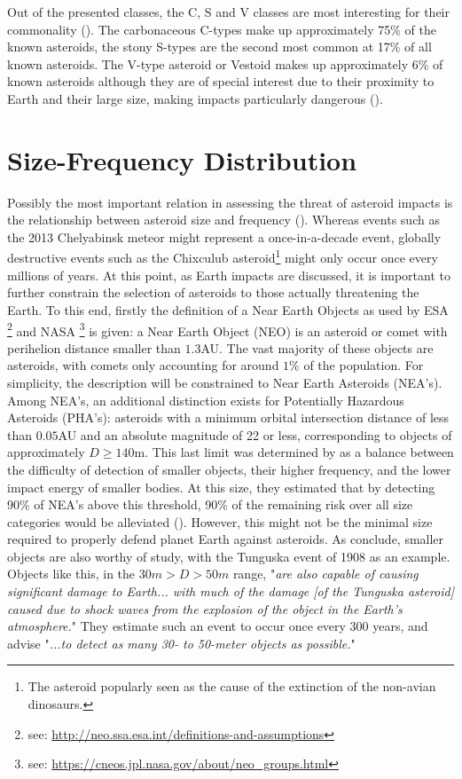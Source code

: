 Out of the presented classes, the C, S and V classes are most interesting for their commonality (\cite{smassiitwo}). The carbonaceous C-types make up approximately 75\% of the known asteroids, the stony S-types are the second most common at 17\% of all known asteroids. The V-type asteroid or Vestoid makes up approximately 6\% of known asteroids although they are of special interest due to their proximity to Earth and their large size, making impacts particularly dangerous (\cite{vestoid}).\\

\section{Size-Frequency Distribution}
\label{sec:sizedistribution}

Possibly the most important relation in assessing the threat of asteroid impacts is the relationship between asteroid size and frequency (\cite{firstpaper}). Whereas events such as the 2013 Chelyabinsk meteor might represent a once-in-a-decade event, globally destructive events such as the Chixculub asteroid\footnote{The asteroid popularly seen as the cause of the extinction of the non-avian dinosaurs.} might only occur once every millions of years. At this point, as Earth impacts are discussed, it is important to further constrain the selection of asteroids to those actually threatening the Earth. To this end, firstly the definition of a Near Earth Objects as used by ESA \footnote{see: \url{http://neo.ssa.esa.int/definitions-and-assumptions}} and NASA \footnote{see: \url{https://cneos.jpl.nasa.gov/about/neo_groups.html}} is given: a Near Earth Object (NEO) is an asteroid or comet with perihelion distance smaller than $1.3$AU. The vast majority of these objects are asteroids, with comets only accounting for around $1\%$ of the population. For simplicity, the description will be constrained to Near Earth Asteroids (NEA's). Among NEA's, an additional distinction exists for Potentially Hazardous Asteroids (PHA's): asteroids with a minimum orbital intersection distance of less than $0.05$AU and an absolute magnitude of 22 or less, corresponding to objects of approximately $D \geq 140$m. This last limit was determined by \cite{neosizelimit} as a balance between the difficulty of detection of smaller objects, their higher frequency, and the lower impact energy of smaller bodies. At this size, they estimated that by detecting 90\% of NEA's above this threshold, 90\% of the remaining risk over all size categories would be alleviated (\cite{subpopulations}). However, this might not be the minimal size required to properly defend planet Earth against asteroids. As \cite{smallneos} conclude, smaller objects are also worthy of study, with the Tunguska event of 1908 as an example. Objects like this, in the $30m > D > 50m$ range, "\textit{are also capable of causing significant damage to Earth... with much of the damage [of the Tunguska asteroid] caused due to shock waves from the explosion of the object in the Earth's atmosphere.}" They estimate such an event to occur once every 300 years, and advise "\textit{...to detect as many 30- to 50-meter objects as possible.}"\\

